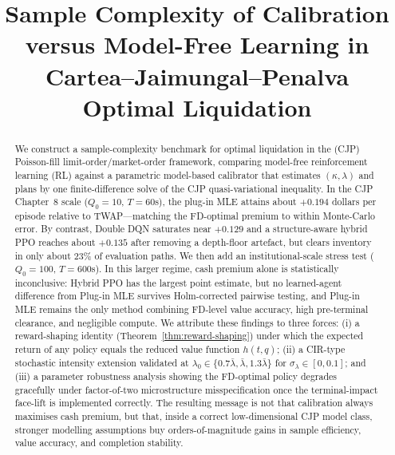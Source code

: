 \documentclass[]{interact}
\theoremstyle{plain}
\theoremstyle{definition}
\theoremstyle{remark}
\newcommand{\1}[1]{\mathbf{1}_{\{#1\}}}
\begin{document}

\title{Sample Complexity of Calibration versus Model-Free Learning in Cartea--Jaimungal--Penalva Optimal Liquidation}

\author{
}

\maketitle

\begin{abstract}
We construct a sample-complexity benchmark for optimal liquidation in the \citet{cjp2015} (CJP) Poisson-fill limit-order/market-order framework, comparing model-free reinforcement learning (RL) against a parametric model-based calibrator that estimates $(\kappa,\lambda)$ and plans by one finite-difference solve of the CJP quasi-variational inequality. In the CJP Chapter~8 scale ($Q_0=10$, $T=60$s), the plug-in MLE attains about $+0.194$ dollars per episode relative to TWAP---matching the FD-optimal premium to within Monte-Carlo error. By contrast, Double DQN saturates near $+0.129$ and a structure-aware hybrid PPO reaches about $+0.135$ after removing a depth-floor artefact, but clears inventory in only about $23\%$ of evaluation paths. We then add an institutional-scale stress test ($Q_0=100$, $T=600$s). In this larger regime, cash premium alone is statistically inconclusive: Hybrid PPO has the largest point estimate, but no learned-agent difference from Plug-in MLE survives Holm-corrected pairwise testing, and Plug-in MLE remains the only method combining FD-level value accuracy, high pre-terminal clearance, and negligible compute. We attribute these findings to three forces: (i) a reward-shaping identity (Theorem~\ref{thm:reward-shaping}) under which the expected return of any policy equals the reduced value function $h(t, q)$; (ii) a CIR-type stochastic intensity extension validated at $\lambda_0\in\{0.7\bar\lambda,\bar\lambda,1.3\bar\lambda\}$ for $\sigma_\lambda \in [0,0.1]$; and (iii) a parameter robustness analysis showing the FD-optimal policy degrades gracefully under factor-of-two microstructure misspecification once the terminal-impact face-lift is implemented correctly. The resulting message is not that calibration always maximises cash premium, but that, inside a correct low-dimensional CJP model class, stronger modelling assumptions buy orders-of-magnitude gains in sample efficiency, value accuracy, and completion stability.
\end{abstract}
\end{document}
